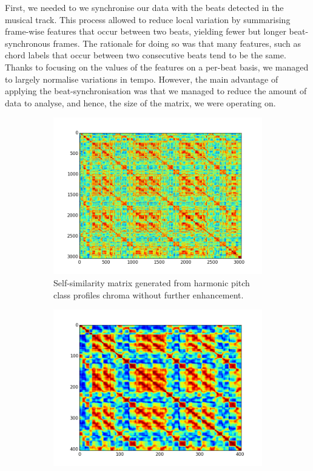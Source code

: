First, we needed to we synchronise our data with the beats detected in the musical track. This process allowed to reduce local variation by summarising frame-wise features that occur between two beats, yielding fewer but longer beat-synchronous frames. The rationale for doing so was that many features, such as chord labels that occur between two consecutive beats tend to be the same. Thanks to focusing on the values of the features on a per-beat basis, we managed to largely normalise variations in tempo. However, the main advantage of applying the beat-synchronisation was that we managed to reduce the amount of data to analyse, and hence, the size of the matrix, we were operating on.

\begin{figure}[b]
        \centering
        \begin{subfigure}[b]{0.47\textwidth}
                \includegraphics[width=\textwidth]{Figures/hpcp_unsynched_ssm}
                \caption{Self-similarity matrix generated from harmonic pitch class profiles chroma without further enhancement.}
                \label{fig:unSSM}
        \end{subfigure}%
        \begin{subfigure}[b]{0.47\textwidth}
                \includegraphics[width=\textwidth]{Figures/log_ssm_synched}

\end{subfigure}
\end{figure}
